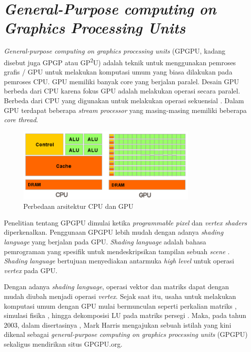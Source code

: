 \section{\emph{General-Purpose computing on Graphics Processing Units}}

  \emph{General-purpose computing on graphics processing units} (GPGPU, kadang disebut juga GPGP atau GP\textsuperscript{2}U) adalah teknik untuk menggunakan pemroses grafis / GPU untuk melakukan komputasi umum yang biasa dilakukan pada pemroses CPU. GPU memiliki banyak core yang berjalan paralel. Desain GPU berbeda dari CPU karena fokus GPU adalah melakukan operasi secara paralel. Berbeda dari CPU yang digunakan untuk melakukan operasi sekuensial \parencite{lindholm2001}. Dalam GPU terdapat beberapa \emph{stream processor} yang masing-masing memiliki beberapa \emph{core thread}.

  \begin{figure}[H]
    \centering
    \includegraphics[width=0.8\textwidth]{resources/GPUvsCPU.png}
    \caption[Perbedaan arsitektur CPU dan GPU]{Perbedaan arsitektur CPU dan GPU \parencite{cuda}}
  \end{figure}

  Penelitian tentang GPGPU dimulai ketika \emph{programmable pixel} dan \emph{vertex shaders} diperkenalkan. Penggunaan GPGPU lebih mudah dengan adanya \emph{shading language} yang berjalan pada GPU. \emph{Shading language} adalah bahasa pemrograman yang spesifik untuk mendeskripsikan tampilan sebuah \emph{scene} \parencite{proudfoot2001}. \emph{Shading language} bertujuan menyediakan antarmuka \emph{high level} untuk operasi \emph{vertex} pada GPU. 

  Dengan adanya \emph{shading language}, operasi vektor dan matriks dapat dengan mudah diubah menjadi operasi \emph{vertex}. Sejak saat itu, usaha untuk melakukan komputasi umum dengan GPU mulai bermunculan seperti perkalian matriks \parencite{matrix2001}, simulasi fisika \parencite{phys2002}, hingga dekomposisi LU pada matriks persegi \parencite{lugpu2005}. Maka, pada tahun 2003, dalam disertasinya \parencite{harris2003}, Mark Harris mengajukan sebuah istilah yang kini dikenal sebagai \emph{general-purpose computing on graphics processing units} (GPGPU) sekaligus mendirikan situs GPGPU.org.

